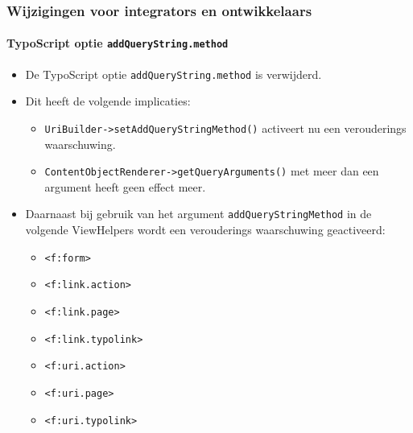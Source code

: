 %

\begin{frame}[fragile]
	\frametitle{Wijzigingen voor integrators en ontwikkelaars}
	\framesubtitle{TypoScript optie \texttt{addQueryString.method}}

	\begin{itemize}
		\item De TypoScript optie \texttt{addQueryString.method} is verwijderd.
		\item Dit heeft de volgende implicaties:

			\begin{itemize}\smaller
				\item \texttt{UriBuilder->setAddQueryStringMethod()} activeert nu een verouderings waarschuwing.
				\item \texttt{ContentObjectRenderer->getQueryArguments()} met meer dan een argument heeft geen effect meer.
			\end{itemize}\normalsize

		\item Daarnaast bij gebruik van het argument \texttt{addQueryStringMethod} in
			de volgende ViewHelpers wordt een verouderings waarschuwing geactiveerd:

			\begin{itemize}\smaller
				\item \texttt{<f:form>}
				\item \texttt{<f:link.action>}
				\item \texttt{<f:link.page>}
				\item \texttt{<f:link.typolink>}
				\item \texttt{<f:uri.action>}
				\item \texttt{<f:uri.page>}
				\item \texttt{<f:uri.typolink>}
			\end{itemize}\normalsize

	\end{itemize}

\end{frame}

